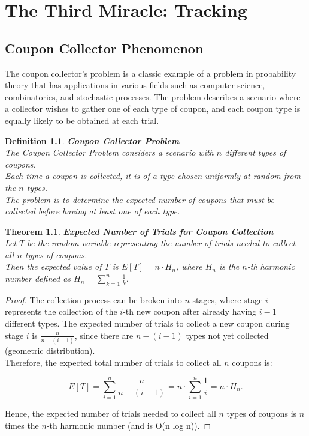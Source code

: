 \documentclass[11pt]{book} %
\newtheorem{theorem}{Theorem}[section]
\newtheorem{definition}{Definition}[section]
\begin{document}
\chapter{The Third Miracle: Tracking}

\section{Coupon Collector Phenomenon}

The coupon collector's problem is a classic example of a problem in probability theory that has applications in various fields such as computer science, 
combinatorics, and stochastic processes. 
The problem describes a scenario where a collector wishes to gather one of each type of coupon, 
and each coupon type is equally likely to be obtained at each trial.

\begin{definition}{\textbf{Coupon Collector Problem}} \\
The \emph{Coupon Collector Problem} considers a scenario with \( n \) different types of coupons.  \\
Each time a coupon is collected, it is of a type chosen uniformly at random from the \( n \) types. \\
The problem is to determine the expected number of coupons that must be collected before having at least one of each type.
\end{definition}

\begin{theorem}{\textbf{Expected Number of Trials for Coupon Collection}} \\
Let \( T \) be the random variable representing the number of trials needed to collect all \( n \) types of coupons. \\ 
Then the expected value of \( T \) is \( E[T] = n \cdot H_n \), where \( H_n \) is the \( n \)-th harmonic number defined as \( H_n = \sum_{k=1}^{n} \frac{1}{k} \).
\end{theorem}

\begin{proof}
The collection process can be broken into \( n \) stages, where stage \( i \) represents the collection of the \( i \)-th new coupon after already
having \( i-1 \) different types. The expected number of trials to collect a new coupon during stage \( i \) is \( \frac{n}{n - (i - 1)} \), 
since there are \( n - (i - 1) \) types not yet collected (geometric distribution). \\ 
Therefore, the expected total number of trials to collect all \( n \) coupons is:

\[
E[T] = \sum_{i=1}^{n} \frac{n}{n - (i - 1)} = n \cdot \sum_{i=1}^{n} \frac{1}{i} = n \cdot H_n.
\]

Hence, the expected number of trials needed to collect all \( n \) types of coupons is \( n \) times the \( n \)-th harmonic number (and is O(n log n)).
\end{proof}
\end{document}

